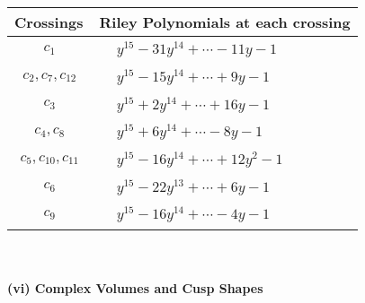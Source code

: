 \documentclass[1p]{elsarticle_modified}
\theoremstyle{definition}
\begin{document}
\begin{tabular}{m{50pt}|m{274pt}}
Crossings & \hspace{64pt}Riley Polynomials at each crossing \\
\hline $$\begin{aligned}c_{1}\end{aligned}$$&$\begin{aligned}
&y^{15}-31 y^{14}+\cdots-11 y-1
\end{aligned}$\\
\hline $$\begin{aligned}c_{2},c_{7},c_{12}\end{aligned}$$&$\begin{aligned}
&y^{15}-15 y^{14}+\cdots+9 y-1
\end{aligned}$\\
\hline $$\begin{aligned}c_{3}\end{aligned}$$&$\begin{aligned}
&y^{15}+2 y^{14}+\cdots+16 y-1
\end{aligned}$\\
\hline $$\begin{aligned}c_{4},c_{8}\end{aligned}$$&$\begin{aligned}
&y^{15}+6 y^{14}+\cdots-8 y-1
\end{aligned}$\\
\hline $$\begin{aligned}c_{5},c_{10},c_{11}\end{aligned}$$&$\begin{aligned}
&y^{15}-16 y^{14}+\cdots+12 y^2-1
\end{aligned}$\\
\hline $$\begin{aligned}c_{6}\end{aligned}$$&$\begin{aligned}
&y^{15}-22 y^{13}+\cdots+6 y-1
\end{aligned}$\\
\hline $$\begin{aligned}c_{9}\end{aligned}$$&$\begin{aligned}
&y^{15}-16 y^{14}+\cdots-4 y-1
\end{aligned}$\\
\hline
\end{tabular}\\~\\
\newpage\flushleft \textbf{(vi) Complex Volumes and Cusp Shapes}
\end{document}
